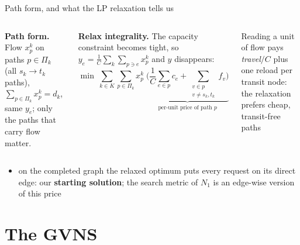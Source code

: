 \documentclass[aspectratio=169,10pt]{beamer}
\begin{document}
\begin{frame}{Path form, and what the LP relaxation tells us}   %
\begin{columns}[T]
\textbf{Path form.} Flow $x^k_p$ on paths $p\in\Pi_k$ (all $s_k\!\to\!t_k$ paths),
$\sum_{p\in\Pi_k}x^k_p=d_k$, same $y_e$; only the paths that carry flow matter.

\medskip
\textbf{Relax integrality.} The capacity constraint becomes tight, so
$y_e=\frac1C\sum_k\sum_{p\ni e}x^k_p$ and $y$ disappears:
\[
\min\ \sum_{k\in K}\sum_{p\in\Pi_k} x^k_p\;
\underbrace{\Bigg(\frac1C\sum_{e\in p} c_e+\sum_{\substack{v\in p\\ v\neq s_k,t_k}} f_v\Bigg)}_{\text{per-unit price of path } p}
\]
\centering
{}

\medskip
\begin{block}{Reading}
a unit of flow pays \emph{travel}$/C$ plus one reload per transit node: the relaxation prefers cheap, transit-free paths
\end{block}
\end{columns}
\medskip
\begin{itemize}
\item on the completed graph the relaxed optimum puts every request on its direct edge: our \textbf{starting solution}; the search metric of $N_1$ is an edge-wise version of this price
\end{itemize}
\end{frame}

\section{The GVNS}
\end{document}
